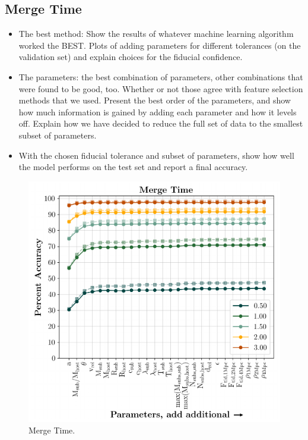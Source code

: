 \documentclass[fleqn,usenatbib]{mnras}
\begin{document}
\subsection{Merge Time}
\label{sec:merge time}
\begin{itemize}
	\item The best method: Show the results of whatever machine learning algorithm worked the BEST. Plots of adding parameters for different tolerances (on the validation set) and explain choices for the fiducial confidence.
	\item The parameters: the best combination of parameters, other combinations that were found to be good, too. Whether or not those agree with feature selection methods that we used. Present the best order of the parameters, and show how much information is gained by adding each parameter and how it levels off. Explain how we have decided to reduce the full set of data to the smallest subset of parameters.
    \item With the chosen fiducial tolerance and subset of parameters, show how well the model performs on the test set and report a final accuracy.
\end{itemize}

\begin{figure}
	\includegraphics[width=\columnwidth]{Figures/time_predictions}
    \caption{Merge Time.}
    \label{fig:time_predictions}
\end{figure}
\end{document}
